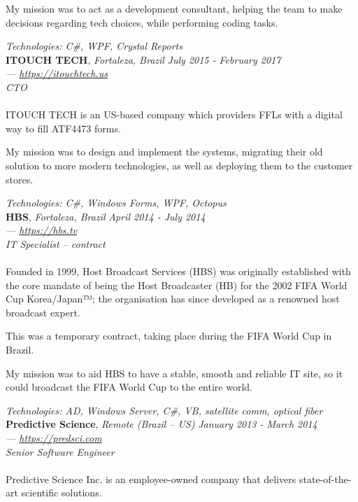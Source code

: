 \documentclass[margin]{res} %
\begin{document}
\begin{resume}
		My mission was to act as a development consultant, helping the team to make decisions regarding tech choices, while performing coding tasks.

		{\sl Technologies: C\#, WPF, Crystal Reports } \\

		{\bf ITOUCH TECH}, {\sl Fortaleza, Brazil} \hfill {\sl July 2015 - February 2017} \\
		{\sl — \href{https://itouchtech.us}{https://itouchtech.us}} \\
		{\sl CTO} \\
		\\
		ITOUCH TECH is an US-based company which providers FFLs with a digital way to fill ATF4473 forms.

		My mission was to design and implement the systems, migrating their old solution to more modern technologies, as well as deploying them to the customer stores.

		{\sl Technologies: C\#, Windows Forms, WPF, Octopus } \\

		{\bf HBS}, {\sl Fortaleza, Brazil} \hfill {\sl April 2014 - July 2014} \\
		{\sl — \href{https://hbs.tv}{https://hbs.tv}} \\
		{\sl IT Specialist -- contract} \\
		\\
		Founded in 1999, Host Broadcast Services (HBS) was originally established with the core mandate of being the Host Broadcaster (HB) for the 2002 FIFA World Cup Korea/Japan™; the organisation has since developed as a renowned host broadcast expert.

		This was a temporary contract, taking place during the FIFA World Cup in Brazil.

		My mission was to aid HBS to have a stable, smooth and reliable IT site, so it could broadcast the FIFA World Cup to the entire world.

		{\sl Technologies: AD, Windows Server, C\#, VB, satellite comm, optical fiber } \\

		{\bf Predictive Science}, {\sl Remote (Brazil -- US)} \hfill {\sl January 2013 - March 2014} \\
		{\sl — \href{https://predsci.com}{https://predsci.com}} \\
		{\sl Senior Software Engineer } \\
		\\
		Predictive Science Inc. is an employee-owned company that delivers state-of-the-art scientific solutions.


\end{resume}
\end{document}
